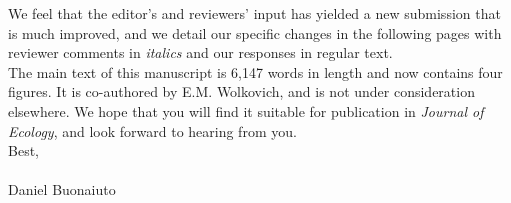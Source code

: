 \documentclass[11 pt]{article}
\begin{document}
\noindent We feel that the editor's and reviewers' input has yielded a new submission that is much improved, and we detail our specific changes in the following pages with reviewer comments in \emph{italics} and our responses in regular text.\\


\noindent The main text of this manuscript is 6,147 words in length and now contains four figures. It is co-authored by E.M. Wolkovich, and is not under consideration elsewhere. We hope that you will find it suitable for publication in \textit{Journal of Ecology}, and look forward to hearing from you.\\


\noindent Best,\\\\




\noindent Daniel Buonaiuto
\end{document}
